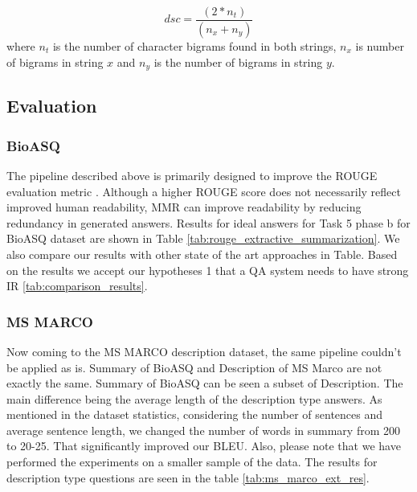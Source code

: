 \begin{equation*}
    dsc = \frac{(2 * n_t)}{ (n_x + n_y)}
\end{equation*}
where $n_t$ is the number of character bigrams found in both strings, $n_x$ is number of bigrams in string $x$ and $n_y$ is the number of bigrams in string $y$.
\subsection{\textbf{Evaluation}}
\subsubsection{BioASQ} 
The pipeline described above is primarily designed to improve the ROUGE evaluation metric \cite{Rougue}. Although a higher ROUGE score does not necessarily reflect improved human readability, MMR can improve readability by reducing redundancy in generated answers.
Results for ideal answers for Task 5 phase b for BioASQ dataset are shown in Table \ref{tab:rouge_extractive_summarization}. We also compare our results with other state of the art approaches in Table. Based on the results we accept our hypotheses 1 that a QA system needs to have strong IR  \ref{tab:comparison_results}.
\subsubsection{MS MARCO}
Now coming to the MS MARCO description dataset, the same pipeline couldn't be applied as is. Summary of BioASQ and Description of MS Marco are not exactly the same. Summary of BioASQ can be seen a subset of Description. The main difference being the average length of the description type answers. As mentioned in the dataset statistics, considering the number of sentences and average sentence length, we changed the number of words in summary from 200 to 20-25. That significantly improved our BLEU. Also, please note that we have performed the experiments on a smaller sample of the data. The results for description type questions are seen in the table \ref{tab:ms_marco_ext_res}.

